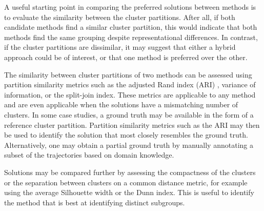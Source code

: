 A useful starting point in comparing the preferred solutions between methods is to evaluate the similarity between the cluster partitions. After all, if both candidate methods find a similar cluster partition, this would indicate that both methods find the same grouping despite representational differences. In contrast, if the cluster partitions are dissimilar, it may suggest that either a hybrid approach could be of interest, or that one method is preferred over the other.

The similarity between cluster partitions of two methods can be assessed using partition similarity metrics such as the adjusted Rand index (ARI) \citep{hubert1985comparing}, variance of information, or the split-join index. These metrics are applicable to any method and are even applicable when the solutions have a mismatching number of clusters. In some case studies, a ground truth may be available in the form of a reference cluster partition. Partition similarity metrics such as the ARI may then be used to identify the solution that most closely resembles the ground truth. Alternatively, one may obtain a partial ground truth by manually annotating a subset of the trajectories based on domain knowledge.

Solutions may be compared further by assessing the compactness of the clusters or the separation between clusters on a common distance metric, for example using the average Silhouette width or the Dunn index. This is useful to identify the method that is best at identifying distinct subgroups.

\renewcommand{\arraystretch}{2}

